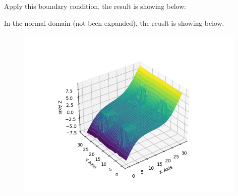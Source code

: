 \documentclass[12pt]{article}
\begin{document}
Apply this boundary condition, the result is showing below:



In the normal domain (not been expanded), the reuslt is showing below. 

\begin{figure}[H]
    \centering
    \includegraphics[width=0.7  \textwidth]{LargePotential001.png}
    \label{LargePotential001.png}

\end{figure}
\end{document}
